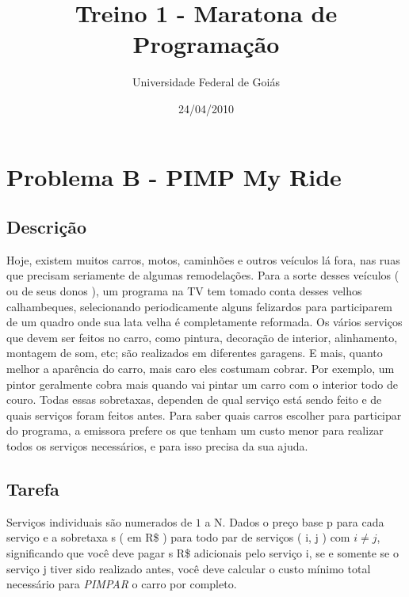 \documentclass[14pt]{article}
\title{Treino 1 - Maratona de Programa\c{c}\~ao }
\author{Universidade Federal de Goi\'as}
\date{24/04/2010}                                           %
\begin{document}
\maketitle




\section{Problema B - PIMP My Ride}

\subsection{Descri\c{c}\~ao}
Hoje, existem muitos carros, motos, caminh\~oes e outros ve\'iculos l\'a fora, nas ruas que precisam seriamente de algumas remodela\c{c}\~oes.
Para a sorte desses ve\'iculos ( ou de seus donos ), um programa na TV tem tomado conta desses velhos calhambeques, selecionando periodicamente alguns felizardos para participarem de um quadro onde sua lata velha \'e completamente reformada.
Os v\'arios servi\c{c}os que devem ser feitos no carro, como pintura, decora\c{c}\~ao de interior, alinhamento, montagem de som, etc; s\~ao realizados em diferentes garagens. E mais, quanto melhor a apar\^encia do carro, mais caro eles costumam cobrar. Por exemplo, um pintor geralmente cobra mais quando vai pintar um carro com o interior todo de couro. Todas essas sobretaxas, dependen de qual servi\c{c}o est\'a sendo feito e de quais servi\c{c}os foram feitos antes.
Para saber quais carros escolher para participar do programa, a emissora prefere os que tenham um custo menor para realizar todos os servi\c{c}os necess\'arios, e para isso precisa da sua ajuda.

\subsection{Tarefa}
Servi\c{c}os individuais s\~ao numerados de $1$ a N. Dados o pre\c{c}o base p para cada servi\c{c}o e a sobretaxa s ( em R\$ ) para todo par de servi\c{c}os ( i, j ) com $i \neq j$, significando que voc\^e deve pagar s R\$ adicionais pelo servi\c{c}o i, se e somente se o servi\c{c}o j tiver sido realizado antes, voc\^e deve calcular o custo m\'inimo total necess\'ario para \emph{ PIMPAR } o carro por completo.
\end{document}
